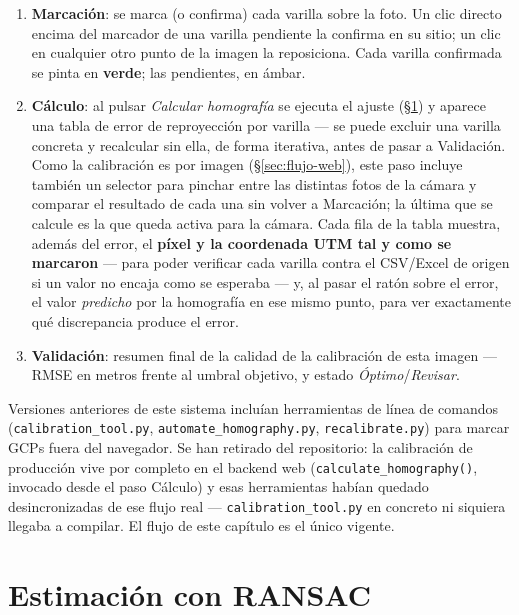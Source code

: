 \begin{enumerate}[leftmargin=1.5em]
  \item \textbf{Marcación}: se marca (o confirma) cada varilla sobre la foto. Un clic directo
        encima del marcador de una varilla pendiente la confirma en su sitio; un clic en
        cualquier otro punto de la imagen la reposiciona. Cada varilla confirmada se pinta en
        \textbf{verde}; las pendientes, en ámbar.
  \item \textbf{Cálculo}: al pulsar \emph{Calcular homografía} se ejecuta el ajuste
        (\S\ref{sec:ransac}) y aparece una tabla de error de reproyección por varilla — se puede
        excluir una varilla concreta y recalcular sin ella, de forma iterativa, antes de pasar a
        Validación. Como la calibración es por imagen (\S\ref{sec:flujo-web}), este paso incluye
        también un selector para pinchar entre las distintas fotos de la cámara y comparar el
        resultado de cada una sin volver a Marcación; la última que se calcule es la que queda
        activa para la cámara. Cada fila de la tabla muestra, además del error, el
        \textbf{píxel y la coordenada UTM tal y como se marcaron} — para poder verificar cada
        varilla contra el CSV/Excel de origen si un valor no encaja como se esperaba — y, al
        pasar el ratón sobre el error, el valor \emph{predicho} por la homografía en ese mismo
        punto, para ver exactamente qué discrepancia produce el error.
  \item \textbf{Validación}: resumen final de la calidad de la calibración de esta imagen —
        RMSE en metros frente al umbral objetivo, y estado \emph{Óptimo}/\emph{Revisar}.
\end{enumerate}

\begin{warnbox}
Versiones anteriores de este sistema incluían herramientas de línea de comandos
(\texttt{calibration\_tool.py}, \texttt{automate\_homography.py}, \texttt{recalibrate.py}) para
marcar GCPs fuera del navegador. Se han retirado del repositorio: la calibración de producción
vive por completo en el backend web (\texttt{calculate\_homography()}, invocado desde el paso
Cálculo) y esas herramientas habían quedado desincronizadas de ese flujo real —
\texttt{calibration\_tool.py} en concreto ni siquiera llegaba a compilar. El flujo de este
capítulo es el único vigente.
\end{warnbox}

\section{Estimación con RANSAC}
\label{sec:ransac}


